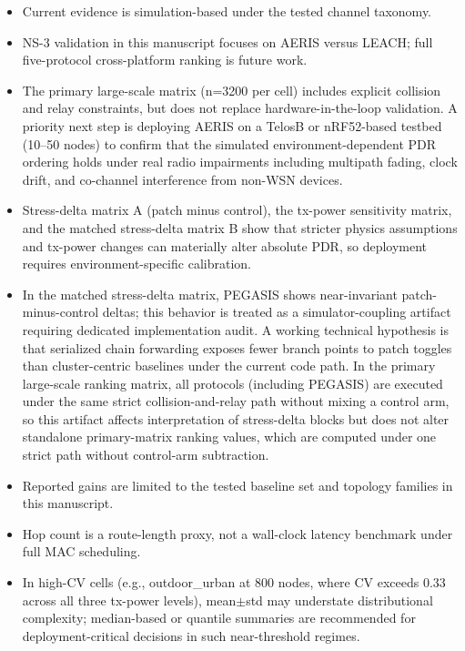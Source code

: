 ﻿\documentclass[sensors,article,submit,moreauthors,pdftex]{Definitions/mdpi}
\begin{document}
\begin{itemize}
\item Current evidence is simulation-based under the tested channel taxonomy.
\item NS-3 validation in this manuscript focuses on AERIS versus LEACH; full five-protocol cross-platform ranking is future work.
\item The primary large-scale matrix (n=3200 per cell) includes explicit collision and relay constraints, but does not replace hardware-in-the-loop validation. A priority next step is deploying AERIS on a TelosB or nRF52-based testbed (10--50 nodes) to confirm that the simulated environment-dependent PDR ordering holds under real radio impairments including multipath fading, clock drift, and co-channel interference from non-WSN devices.
\item Stress-delta matrix A (patch minus control), the tx-power sensitivity matrix, and the matched stress-delta matrix B show that stricter physics assumptions and tx-power changes can materially alter absolute PDR, so deployment requires environment-specific calibration.
\item In the matched stress-delta matrix, PEGASIS shows near-invariant patch-minus-control deltas; this behavior is treated as a simulator-coupling artifact requiring dedicated implementation audit. A working technical hypothesis is that serialized chain forwarding exposes fewer branch points to patch toggles than cluster-centric baselines under the current code path. In the primary large-scale ranking matrix, all protocols (including PEGASIS) are executed under the same strict collision-and-relay path without mixing a control arm, so this artifact affects interpretation of stress-delta blocks but does not alter standalone primary-matrix ranking values, which are computed under one strict path without control-arm subtraction.
\item Reported gains are limited to the tested baseline set and topology families in this manuscript.
\item Hop count is a route-length proxy, not a wall-clock latency benchmark under full MAC scheduling.
\item In high-CV cells (e.g., outdoor\_urban at 800 nodes, where CV exceeds 0.33 across all three tx-power levels), mean$\pm$std may understate distributional complexity; median-based or quantile summaries are recommended for deployment-critical decisions in such near-threshold regimes.
\end{itemize}
\end{document}
